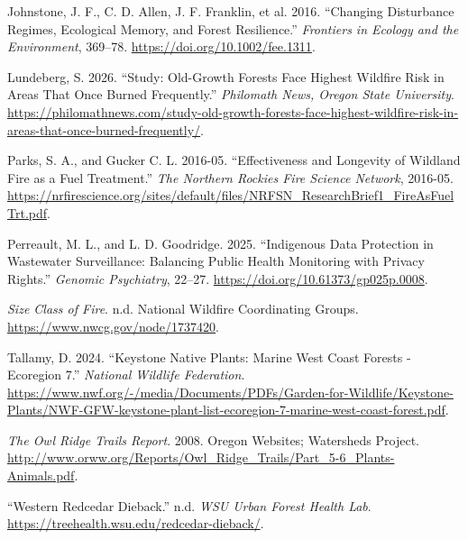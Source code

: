 \documentclass[
  letterpaper,
  DIV=11,
  numbers=noendperiod]{scrartcl}
\newlength{\cslhangindent}
\newenvironment{CSLReferences}[2] %
 {\begin{list}{}{%
  \setlength{\itemindent}{0pt}
  \setlength{\leftmargin}{0pt}
  \setlength{\parsep}{0pt}
  \ifodd #1
   \setlength{\leftmargin}{\cslhangindent}
   \setlength{\itemindent}{-1\cslhangindent}
  \fi
  \setlength{\itemsep}{#2\baselineskip}}}
 {\end{list}}
\begin{document}
\begin{CSLReferences}{1}{1}
Johnstone, J. F., C. D. Allen, J. F. Franklin, et al. 2016. {``Changing
Disturbance Regimes, Ecological Memory, and Forest Resilience.''}
\emph{Frontiers in Ecology and the Environment}, 369--78.
\url{https://doi.org/10.1002/fee.1311}.

Lundeberg, S. 2026. {``Study: Old-Growth Forests Face Highest Wildfire
Risk in Areas That Once Burned Frequently.''} \emph{Philomath News,
Oregon State University}.
\url{https://philomathnews.com/study-old-growth-forests-face-highest-wildfire-risk-in-areas-that-once-burned-frequently/}.

Parks, S. A., and Gucker C. L. 2016-05. {``Effectiveness and Longevity
of Wildland Fire as a Fuel Treatment.''} \emph{The Northern Rockies Fire
Science Network}, 2016-05.
\url{https://nrfirescience.org/sites/default/files/NRFSN_ResearchBrief1_FireAsFuelTrt.pdf}.

Perreault, M. L., and L. D. Goodridge. 2025. {``Indigenous Data
Protection in Wastewater Surveillance: Balancing Public Health
Monitoring with Privacy Rights.''} \emph{Genomic Psychiatry}, 22--27.
\url{https://doi.org/10.61373/gp025p.0008}.

\emph{Size Class of Fire}. n.d. National Wildfire Coordinating Groups.
\url{https://www.nwcg.gov/node/1737420}.

Tallamy, D. 2024. {``Keystone Native Plants: Marine West Coast Forests -
Ecoregion 7.''} \emph{National Wildlife Federation}.
\url{https://www.nwf.org/-/media/Documents/PDFs/Garden-for-Wildlife/Keystone-Plants/NWF-GFW-keystone-plant-list-ecoregion-7-marine-west-coast-forest.pdf}.

\emph{The Owl Ridge Trails Report}. 2008. Oregon Websites; Watersheds
Project.
\url{http://www.orww.org/Reports/Owl_Ridge_Trails/Part_5-6_Plants-Animals.pdf}.

{``Western Redcedar Dieback.''} n.d. \emph{WSU Urban Forest Health Lab}.
\url{https://treehealth.wsu.edu/redcedar-dieback/}.

\end{CSLReferences}
\end{document}
